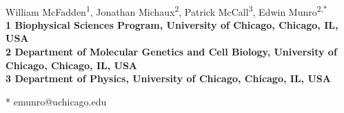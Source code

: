 \documentclass[10pt,letterpaper]{article}
\date{}
\begin{document}
\vspace*{0.35in}

\begin{flushleft}
{\Large
\textbf{}
}
\newline
\\
William McFadden\textsuperscript{1},
Jonathan Michaux\textsuperscript{2},
Patrick McCall\textsuperscript{3},
Edwin Munro\textsuperscript{2,*}
\\
\bigskip
\bf{1} Biophysical Sciences Program, University of Chicago, Chicago, IL, USA
\\
\bf{2} Department of Molecular Genetics and Cell Biology, University of Chicago, Chicago, IL, USA
\\
\bf{3} Department of Physics, University of Chicago, Chicago, IL, USA
\\
\bigskip

% 
%





* emunro@uchicago.edu

\end{flushleft}
\end{document}
